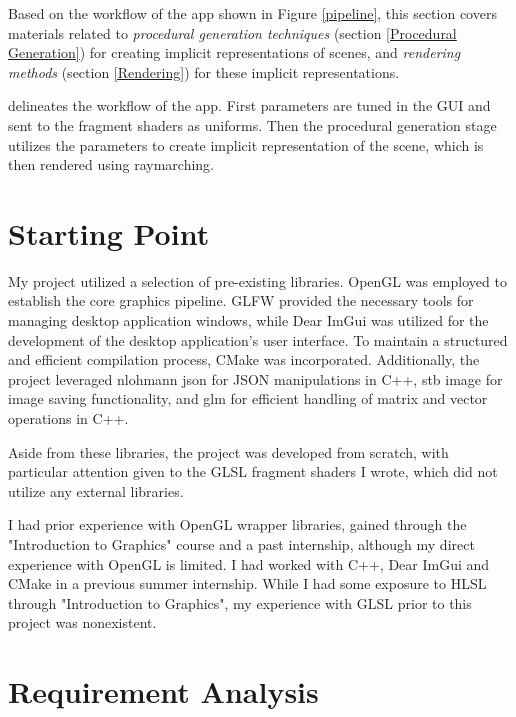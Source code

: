 \label{sec:2}


Based on the workflow of the app shown in Figure \ref{pipeline}, this section covers materials related to \textit{procedural generation techniques} (section \ref{Procedural Generation}) for creating implicit representations of scenes, and \textit{rendering methods} (section \ref{Rendering}) for these implicit representations. 


{delineates the workflow of the app. First parameters are tuned in the GUI and sent to the fragment shaders as uniforms. Then the procedural generation stage utilizes the parameters to create implicit representation of the scene, which is then rendered using raymarching.}

\section{Starting Point}
\label{sec:Starting Point}

My project utilized a selection of pre-existing libraries. OpenGL was employed to establish the core graphics pipeline. GLFW provided the necessary tools for managing desktop application windows, while Dear ImGui was utilized for the development of the desktop application's user interface. To maintain a structured and efficient compilation process, CMake was incorporated. Additionally, the project leveraged nlohmann json for JSON manipulations in C++, stb image for image saving functionality, and glm for efficient handling of matrix and vector operations in C++.

Aside from these libraries, the project was developed from scratch, with particular attention given to the GLSL fragment shaders I wrote, which did not utilize any external libraries.

I had prior experience with OpenGL wrapper libraries, gained through the "Introduction to Graphics" course and a past internship, although my direct experience with OpenGL is limited. I had worked with C++, Dear ImGui and CMake in a previous summer internship. While I had some exposure to HLSL through "Introduction to Graphics", my experience with GLSL prior to this project was nonexistent.

\section{Requirement Analysis}
\label{sec:Requirement}

